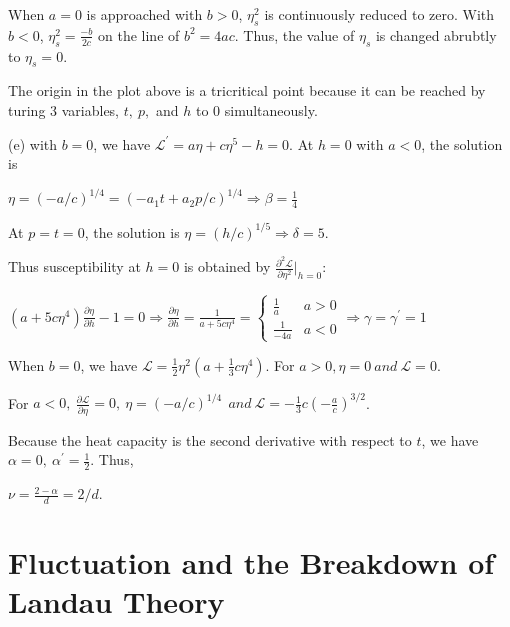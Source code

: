 \documentclass[12pt,titlepage]{article}
\numberwithin{equation}{section}
\begin{document}
When $\displaystyle a=0$ is approached with $\displaystyle b >0$, $\displaystyle \eta ^{2}_{s}$ is continuously reduced to zero. With $\displaystyle b< 0$, $\displaystyle \eta ^{2}_{s} =\frac{-b}{2c}$ on the line of $\displaystyle b^{2} =4ac$. Thus, the value of $\displaystyle \eta _{s}$ is changed abrubtly to $\displaystyle \eta _{s} =0$.



The origin in the plot above is a tricritical point because it can be reached by turing 3 variables, $\displaystyle t,\ p,$ and $\displaystyle h$ to 0 simultaneously.



(e) with $\displaystyle b=0$, we have $\displaystyle \mathcal{L}^{'} =a\eta +c\eta ^{5} -h=0$. At $\displaystyle h=0$ with $\displaystyle a< 0$, the solution is 

$\displaystyle \eta =( -a/c)^{1/4} =( -a_{1} t+a_{2} p/c)^{1/4} \Rightarrow \beta =\frac{1}{4}$

At $\displaystyle p=t=0$, the solution is $\displaystyle \eta =( h/c)^{1/5} \Rightarrow \delta =5$.

Thus susceptibility at $\displaystyle h=0$ is obtained by $\displaystyle \frac{\partial ^{2}\mathcal{L}}{\partial \eta ^{2}} |_{h=0}$:

$\displaystyle \left( a+5c\eta ^{4}\right)\frac{\partial \eta }{\partial h} -1=0\Rightarrow \frac{\partial \eta }{\partial h} =\frac{1}{a+5c\eta ^{4}} =\left\{\begin{matrix}
\frac{1}{a} & a >0\\
\frac{1}{-4a} & a< 0
\end{matrix}\right. \Rightarrow \gamma =\gamma ^{'} =1$



When $\displaystyle b=0$, we have $\displaystyle \mathcal{L} =\frac{1}{2} \eta ^{2}\left( a+\frac{1}{3} c\eta ^{4}\right)$. For $\displaystyle a >0,\eta =0\ and\ \mathcal{L} =0$. 

For $\displaystyle a< 0,\ \frac{\partial \mathcal{L}}{\partial \eta } =0,\ \eta =( -a/c)^{1/4} \ \ and\ \mathcal{L} =-\frac{1}{3} c\left( -\frac{a}{c}\right)^{3/2}$.

Because the heat capacity is the second derivative with respect to $\displaystyle t$, we have $\displaystyle \alpha =0,\ \alpha ^{'} =\frac{1}{2}$. Thus,

$\displaystyle \nu =\frac{2-\alpha }{d} =2/d$.

\section{Fluctuation and the Breakdown of Landau Theory}
\end{document}
